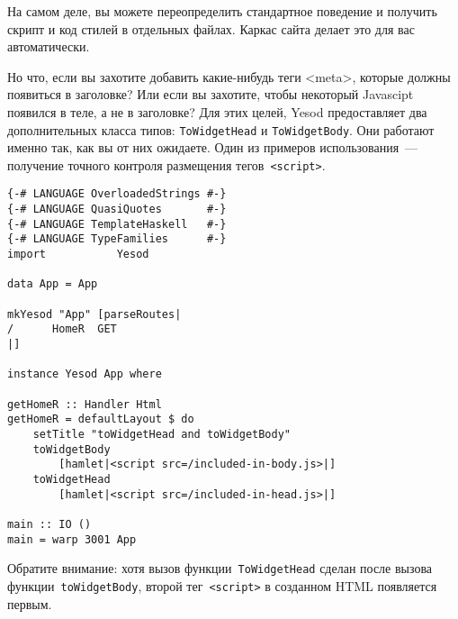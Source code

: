 \begin{remark}
    На самом деле, вы можете переопределить стандартное поведение и получить
    скрипт и код стилей в отдельных файлах. Каркас сайта делает это для вас
    автоматически.
\end{remark}

Но что, если вы захотите добавить какие-нибудь теги <meta>, которые должны
появиться в заголовке? Или если вы захотите, чтобы некоторый Javascipt появился
в теле, а не в заголовке? Для этих целей, Yesod предоставляет два
дополнительных класса типов: \lstinline'ToWidgetHead' и
\lstinline'ToWidgetBody'. Они работают именно так, как вы от них ожидаете. Один
из примеров использования~--- получение точного контроля размещения
тегов~\texttt{<script>}.

\begin{lstlisting}
{-# LANGUAGE OverloadedStrings #-}
{-# LANGUAGE QuasiQuotes       #-}
{-# LANGUAGE TemplateHaskell   #-}
{-# LANGUAGE TypeFamilies      #-}
import           Yesod

data App = App

mkYesod "App" [parseRoutes|
/      HomeR  GET
|]

instance Yesod App where

getHomeR :: Handler Html
getHomeR = defaultLayout $ do
    setTitle "toWidgetHead and toWidgetBody"
    toWidgetBody
        [hamlet|<script src=/included-in-body.js>|]
    toWidgetHead
        [hamlet|<script src=/included-in-head.js>|]

main :: IO ()
main = warp 3001 App
\end{lstlisting}

Обратите внимание: хотя вызов функции~\lstinline'ToWidgetHead' сделан после
вызова функции~\lstinline'toWidgetBody', второй тег~\texttt{<script>} в
созданном HTML появляется первым.

